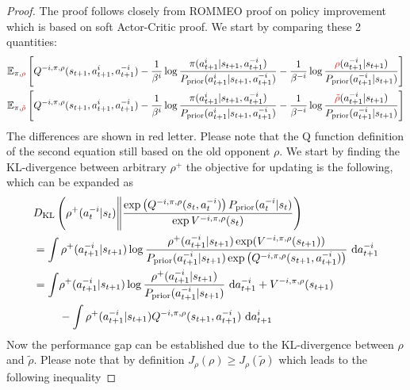 \begin{proof}
The proof follows closely from ROMMEO proof on policy improvement \cite{tian2019regularized} which is based on soft Actor-Critic \cite{haarnoja2018softa} proof. We start by comparing these 2 quantities:
\begin{equation*}
\begin{aligned}
    &\mathbb{E}_{\pi, {\color{red} \rho}}\left[ Q^{-i, \pi, \rho}(s_{t+1}, a^i_{t+1}, a^{-i}_{t+1}) - \frac{1}{\beta^i} \log\frac{\pi(a^i_{t+1}|s_{t+1}, a^{-i}_{t+1})}{P_{\text{prior}}(a^i_{t+1}|s_{t+1}, a^{-i}_{t+1})} - \frac{1}{\beta^{-i}}\log \frac{{\color{red} \rho}(a^{-i}_{t+1}|s_{t+1})}{P_{\text{prior}}(a^{-i}_{t+1}|s_{t+1})} \right] \\
    &\mathbb{E}_{\pi, {\color{red} \tilde{\rho}}}\left[ Q^{-i, \pi, \rho}(s_{t+1}, a^i_{t+1}, a^{-i}_{t+1}) - \frac{1}{\beta^i} \log\frac{\pi(a^i_{t+1}|s_{t+1}, a^{-i}_{t+1})}{P_{\text{prior}}(a^i_{t+1}|s_{t+1}, a^{-i}_{t+1})} - \frac{1}{\beta^{-i}}\log \frac{{\color{red} \tilde{\rho}}(a^{-i}_{t+1}|s_{t+1})}{P_{\text{prior}}(a^{-i}_{t+1}|s_{t+1})} \right]
\end{aligned}
\end{equation*}
The differences are shown in red letter. Please note that the Q function definition of the second equation still based on the old opponent $\rho$. We start by finding the KL-divergence between arbitrary $\rho^+$ the objective for updating is the following, which can be expanded as 
\begin{equation*}
\begin{aligned}
    &D_{\mathrm{KL}} \left(  \rho^+(a^{-i}_t | s_t) \Bigg\| \frac{\exp\left( Q^{-i, \pi, \rho}(s_t, a^{-i}_t) \right) P_{\text{prior}}(a^{-i}_t | s_t)}{\exp V^{-i, \pi, \rho}(s_t)} \right) \\
    &= \int  \rho^+(a^{-i}_{t+1} | s_{t+1}) \log \frac{\rho^+(a^{-i}_{t+1} | s_{t+1}) \exp(V^{-i, \pi, \rho}(s_{t+1})) }{P_{\text{prior}}(a^{-i}_{t+1} | s_{t+1}) \exp\left( Q^{-i, \pi, \rho}(s_{t+1}, a^{-i}_{t+1}) \right) } \ \mathrm{d} a^{-i}_{t+1} \\
    &=\begin{aligned}[t]
    \int &\rho^+(a^{-i}_{t+1} | s_{t+1}) \log\frac{\rho^+(a^{-i}_{t+1} | s_{t+1})}{P_{\text{prior}}(a^{-i}_{t+1} | s_{t+1})} \ \mathrm{d} a^{-i}_{t+1} + V^{-i, \pi, \rho}(s_{t+1}) \\
    &- \int \rho^+(a^{-i}_{t+1} | s_{t+1}) Q^{-i, \pi, \rho}(s_{t+1}, a^{-i}_{t+1}) \ \mathrm{d} a^{i}_{t+1}
    \end{aligned}
\end{aligned}
\end{equation*}
Now the performance gap can be established due to the KL-divergence between $\rho$ and $\tilde{\rho}$. Please note that by definition $J_{\rho}(\rho) \ge J_{\rho}(\tilde{\rho})$ which leads to the following inequality

\end{proof}
